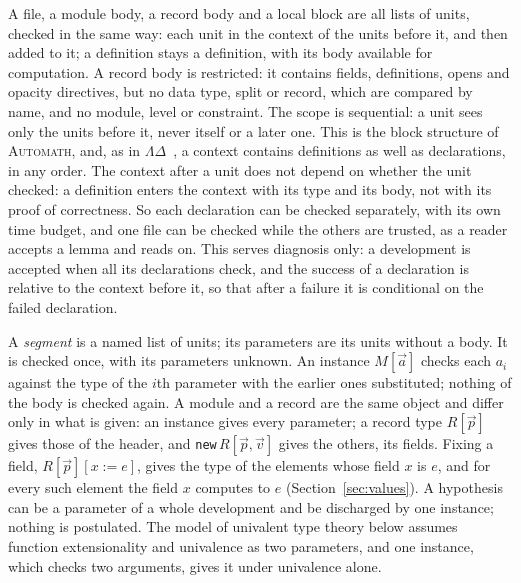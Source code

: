 \documentclass[11pt]{article}
\newcommand{\kw}[1]{\texttt{#1}}
\begin{document}
A file, a module body, a record body and a local block are all lists of
units, checked in the same way: each unit in the context of the units
before it, and then added to it; a definition stays a definition, with
its body available for computation. A record body is restricted: it
contains fields, definitions, opens and opacity directives, but no data
type, split or record, which are compared by name, and no module, level
or constraint. The scope is sequential: a unit sees
only the units before it, never itself or a later one. This is the block
structure of \textsc{Automath}, and, as in $\Lambda\Delta$~\cite{LD}, a
context contains definitions as well as declarations, in any order. The
context after a unit does not depend on whether the unit checked: a
definition enters the context with its type and its body, not with its
proof of correctness. So each declaration can be checked separately,
with its own time budget, and one file can be checked while the others
are trusted, as a reader accepts a lemma and reads on. This serves
diagnosis only: a development is accepted when all its declarations
check, and the success of a declaration is relative to the context
before it, so that after a failure it is conditional on the failed
declaration.

A \emph{segment} is a named list of units; its parameters are its units
without a body. It is checked once, with its parameters unknown. An
instance $M[\vec a]$ checks each $a_i$ against the type of the $i$th
parameter with the earlier ones substituted; nothing of the body is
checked again. A module and a record are the same object and differ only
in what is given: an instance gives every parameter; a record type
$R[\vec p]$ gives those of the header, and \kw{new}\,$R[\vec p,\vec v]$
gives the others, its fields. Fixing a field, $R[\vec p][x:=e]$, gives
the type of the elements whose field $x$ is $e$, and for every such
element the field $x$ computes to $e$ (Section~\ref{sec:values}). A hypothesis can be a parameter of a whole
development and be discharged by one instance; nothing is postulated.
The model of univalent type theory below assumes function
extensionality and univalence as two parameters, and one instance,
which checks two arguments, gives it under univalence alone.
\end{document}
